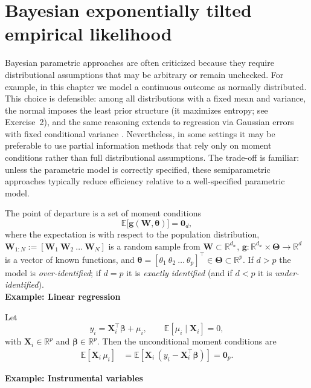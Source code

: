 \section{Bayesian exponentially tilted empirical likelihood}\label{sec12_9}

Bayesian parametric approaches are often criticized because they require distributional assumptions that may be arbitrary or remain unchecked. For example, in this chapter we model a continuous outcome as normally distributed. This choice is defensible: among all distributions with a fixed mean and variance, the normal imposes the least prior structure (it maximizes entropy; see Exercise~2), and the same reasoning extends to regression via Gaussian errors with fixed conditional variance \cite{zellner1996bmom}. Nevertheless, in some settings it may be preferable to use partial information methods that rely only on moment conditions rather than full distributional assumptions. The trade-off is familiar: unless the parametric model is correctly specified, these semiparametric approaches typically reduce efficiency relative to a well-specified parametric model.

The point of departure is a set of moment conditions
\[
\mathbb{E}\!\big[\mathbf{g}(\mathbf{W},\boldsymbol{\theta})\big]=\mathbf{0}_{d},
\]
where the expectation is with respect to the population distribution, $\mathbf{W}_{1:N}:=[\mathbf{W}_1 \ \mathbf{W}_2 \ \dots \ \mathbf{W}_N]$ is a random sample from $\mathbf{W}\subset \mathbb{R}^{d_w}$, $\mathbf{g}:\mathbb{R}^{d_w}\times\boldsymbol{\Theta}\to\mathbb{R}^{d}$ is a vector of known functions, and 
$\boldsymbol{\theta}=[\theta_{1}\ \theta_{2}\ \dots\ \theta_{p}]^{\top}\in\boldsymbol{\Theta}\subset\mathbb{R}^{p}$.
If $d>p$ the model is \emph{over-identified}; if $d=p$ it is \emph{exactly identified} (and if $d<p$ it is \emph{under-identified}).\\

\textbf{Example: Linear regression}

Let
\[
y_i=\mathbf{X}_i^{\top}\boldsymbol{\beta}+\mu_i,\qquad \mathbb{E}[\mu_i\mid \mathbf{X}_i]=0,
\]
with $\mathbf{X}_i\in\mathbb{R}^{p}$ and $\boldsymbol{\beta}\in\mathbb{R}^{p}$. Then the unconditional moment conditions are
\begin{align*}
	\mathbb{E}\!\left[\mathbf{X}_i\,\mu_i\right]
	&=\mathbb{E}\!\left[\mathbf{X}_i\,(y_i-\mathbf{X}_i^{\top}\boldsymbol{\beta})\right]
	=\mathbf{0}_{p}.
\end{align*}

\textbf{Example: Instrumental variables}

